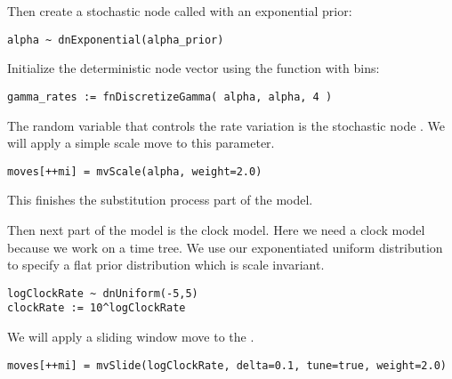 Then create a stochastic node called  with an exponential prior:
{\tt\begin{snugshade*}
\begin{lstlisting}
alpha ~ dnExponential(alpha_prior)
\end{lstlisting}
\end{snugshade*}}
Initialize the  deterministic node vector using the   function with  bins:
{\tt \begin{snugshade*}
\begin{lstlisting}
gamma_rates := fnDiscretizeGamma( alpha, alpha, 4 )
\end{lstlisting}
\end{snugshade*}}
The random variable that controls the rate variation is the stochastic node . 
We will apply a simple scale move to this parameter.
{\tt \begin{snugshade*}
\begin{lstlisting}
moves[++mi] = mvScale(alpha, weight=2.0)
\end{lstlisting}
\end{snugshade*}}
This finishes the substitution process part of the model.

Then next part of the model is the clock model. Here we need a clock model because we work on a time tree. We use our exponentiated uniform distribution to specify a flat prior distribution which is scale invariant.
{\tt \begin{snugshade*}
\begin{lstlisting}
logClockRate ~ dnUniform(-5,5)
clockRate := 10^logClockRate
\end{lstlisting}
\end{snugshade*}}
We will apply a sliding window move to the .
{\tt \begin{snugshade*}
\begin{lstlisting}
moves[++mi] = mvSlide(logClockRate, delta=0.1, tune=true, weight=2.0)
\end{lstlisting}
\end{snugshade*}}

